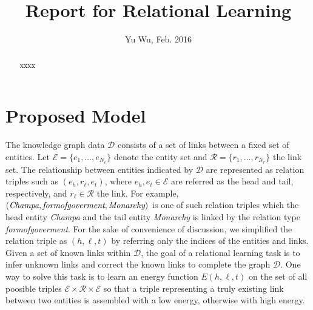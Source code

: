 \documentclass[10pt,journal]{IEEEtran}
\begin{document}
\title{Report for Relational Learning}
\author{ Yu Wu, Feb. 2016
             }
\maketitle

\begin{abstract}
xxxx
\end{abstract}


\section{Proposed Model}
The knowledge graph data $\mathcal{D}$ consists of a set of links between a fixed set of entities. Let $\mathcal{E} = \{e_1, \ldots, e_{N_e}\}$ denote the entity set and $\mathcal{R} = \{r_1, \ldots, r_{N_r}\}$ the link set.  The relationship between entities indicated by $\mathcal{D}$ are represented as relation triples such as $(e_h,r_{\ell},e_t)$, where $e_h, e_t\in \mathcal{E}$ are referred as the head  and tail, respectively, and  $r_{\ell} \in \mathcal{R}$ the link.  For example, $(\emph{Champa}, \emph{formofgoverment}, \emph{Monarchy})$ is one of such relation triples which the head entity \emph{Champa} and the tail entity \emph{Monarchy} is linked by the relation type \emph{formofgoverment}.  For the sake of convenience of discussion, we simplified the relation triple as $(h,\ell, t)$   by referring only the indices of the entities and links. Given a set of known links within $\mathcal{D}$, the goal of a relational learning task is to  infer unknown links and correct the known links to complete the graph $\mathcal{D}$. One way to solve this task is to learn an energy function $E(h, \ell, t)$ on the set of all poosible triples $\mathcal{E} \times \mathcal{R} \times \mathcal{E}$ so that a triple representing a truly existing link between two entities  is assembled with a low energy, otherwise with high energy. 

\end{document}
